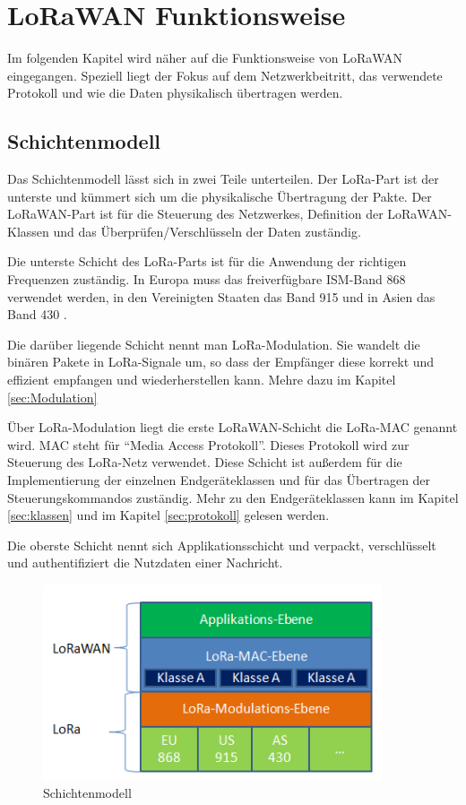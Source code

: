 \documentclass[a4paper, 12pt]{article}
\begin{document}
    \section{LoRaWAN Funktionsweise}
        Im folgenden Kapitel wird näher auf die Funktionsweise von LoRaWAN eingegangen. Speziell liegt der Fokus auf
        dem Netzwerkbeitritt, das verwendete Protokoll und wie die Daten physikalisch übertragen werden.
        \subsection{Schichtenmodell}
            Das Schichtenmodell lässt sich in zwei Teile unterteilen. Der LoRa-Part ist der unterste und kümmert sich 
            um die physikalische Übertragung der Pakte. Der LoRaWAN-Part ist für die Steuerung des 
            Netzwerkes, Definition der LoRaWAN-Klassen und das Überprüfen/Verschlüsseln der Daten zuständig.

            Die unterste Schicht des LoRa-Parts ist für die Anwendung der richtigen Frequenzen zuständig. In Europa 
            muss das freiverfügbare ISM-Band 868 verwendet werden, in den Vereinigten Staaten das Band 915 und 
            in Asien das Band 430 .\cite[S.7]{WhatIsLoRa}

            Die darüber liegende Schicht nennt man LoRa-Modulation. Sie wandelt die binären Pakete in 
            LoRa-Signale um, so dass der Empfänger diese korrekt und effizient empfangen und wiederherstellen 
            kann. Mehre dazu im Kapitel  \ref{sec:Modulation} 

            Über LoRa-Modulation liegt die erste LoRaWAN-Schicht die LoRa-MAC genannt wird. MAC steht für ``Media Access 
            Protokoll''. Dieses Protokoll wird zur Steuerung des LoRa-Netz verwendet. Diese Schicht ist außerdem für 
            die Implementierung der einzelnen Endgeräteklassen 
            und für das Übertragen der Steuerungskommandos zuständig. Mehr zu den Endgeräteklassen kann im Kapitel 
            \ref{sec:klassen}  und im Kapitel \ref{sec:protokoll}  gelesen werden.

            Die oberste Schicht nennt sich Applikationsschicht und verpackt, verschlüsselt und authentifiziert 
            die Nutzdaten einer Nachricht.

            \begin{figure}[ht]
                \centering
                \includegraphics[width=10cm]{LoraLayer}
                \caption{Schichtenmodell}
            \end{figure}
 
\end{document}
